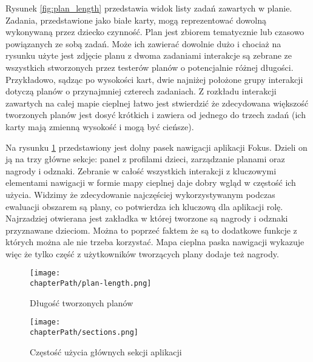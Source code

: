 Rysunek \ref{fig:plan_length} przedstawia widok listy zadań zawartych w planie. Zadania, przedstawione jako białe karty, mogą reprezentować dowolną wykonywaną przez dziecko czynność. Plan jest zbiorem tematycznie lub czasowo powiązanych ze sobą zadań. Może ich zawierać dowolnie dużo i chociaż na rysunku użyte jest zdjęcie planu z dwoma zadaniami interakcje są zebrane ze wszystkich stworzonych przez testerów planów o potencjalnie różnej długości. Przykładowo, sądząc po wysokości kart, dwie najniżej położone grupy interakcji dotyczą planów o przynajmniej czterech zadaniach. Z rozkładu interakcji zawartych na całej mapie cieplnej łatwo jest stwierdzić że zdecydowana większość tworzonych planów jest dosyć krótkich i zawiera od jednego do trzech zadań (ich karty mają zmienną wysokość i mogą być cieńsze).

Na rysunku \ref{fig:sections_usage} przedstawiony jest dolny pasek nawigacji aplikacji Fokus. Dzieli on ją na trzy główne sekcje: panel z profilami dzieci, zarządzanie planami oraz nagrody i odznaki. Zebranie w całość wszystkich interakcji z kluczowymi elementami nawigacji w formie mapy cieplnej daje dobry wgląd w częstość ich użycia. Widzimy że zdecydowanie najczęściej wykorzystywanym podczas ewaluacji obszarem są plany, co potwierdza ich kluczową dla aplikacji rolę. Najrzadziej otwierana jest zakładka w której tworzone są nagrody i odznaki przyznawane dzieciom. Można to poprzeć faktem że są to dodatkowe funkcje z których można ale nie trzeba korzystać. Mapa cieplna paska nawigacji wykazuje więc że tylko część z użytkowników tworzących plany dodaje też nagrody.

\bigskip
\begin{figure}[H]
\centering
\begin{minipage}{.4\textwidth}
	\centering
	\texttt{[image: \\chapterPath/plan-length.png]}
	\bigskip
	\caption{Długość tworzonych planów}
	\label{fig:plan_length}
\end{minipage}
\begin{minipage}{.55\textwidth}
	\centering
	\texttt{[image: \\chapterPath/sections.png]}
	\bigskip
	\caption{Częstość użycia głównych sekcji aplikacji}
	\label{fig:sections_usage}
\end{minipage}
\end{figure}
